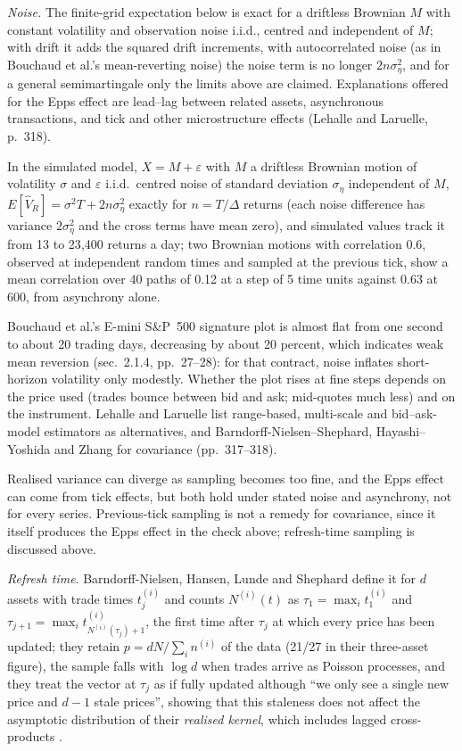 \begin{qfmethod}
\emph{Noise.} The finite-grid expectation below is exact for a driftless Brownian $M$ with constant volatility and observation noise i.i.d., centred and independent of $M$; with drift it adds the squared drift increments, with autocorrelated noise (as in Bouchaud et al.'s mean-reverting noise) the noise term is no longer $2n\sigma_\eta^2$, and for a general semimartingale only the limits above are claimed. Explanations offered for the Epps effect are lead--lag between related assets, asynchronous transactions, and tick and other microstructure effects (Lehalle and Laruelle, p.~318).

In the simulated model, $X=M+\varepsilon$ with $M$ a driftless Brownian motion of volatility $\sigma$ and $\varepsilon$ i.i.d.\ centred noise of standard deviation $\sigma_\eta$ independent of $M$, $E[\hat V_R]=\sigma^2T+2n\sigma_\eta^2$ exactly for $n=T/\Delta$ returns (each noise difference has variance $2\sigma_\eta^2$ and the cross terms have mean zero), and simulated values track it from 13 to 23{,}400 returns a day; two Brownian motions with correlation 0.6, observed at independent random times and sampled at the previous tick, show a mean correlation over 40 paths of 0.12 at a step of 5 time units against 0.63 at 600, from asynchrony alone.

 Bouchaud et al.'s E-mini S\&P~500 signature plot is almost flat from one second to about 20 trading days, decreasing by about 20 percent, which indicates weak mean reversion (sec.~2.1.4, pp.~27--28): for that contract, noise inflates short-horizon volatility only modestly. Whether the plot rises at fine steps depends on the price used (trades bounce between bid and ask; mid-quotes much less) and on the instrument. Lehalle and Laruelle list range-based, multi-scale and bid--ask-model estimators as alternatives, and Barndorff-Nielsen--Shephard, Hayashi--Yoshida and Zhang for covariance (pp.~317--318).

 Realised variance can diverge as sampling becomes too fine, and the Epps effect can come from tick effects, but both hold under stated noise and asynchrony, not for every series. Previous-tick sampling is not a remedy for covariance, since it itself produces the Epps effect in the check above; refresh-time sampling is discussed above.

\emph{Refresh time}. Barndorff-Nielsen, Hansen, Lunde and Shephard define it for $d$ assets with trade times $t^{(i)}_j$ and counts $N^{(i)}(t)$ as $\tau_1=\max_i t^{(i)}_1$ and $\tau_{j+1}=\max_i t^{(i)}_{N^{(i)}(\tau_j)+1}$, the first time after $\tau_j$ at which every price has been updated; they retain $p=dN/\sum_i n^{(i)}$ of the data (21/27 in their three-asset figure), the sample falls with $\log d$ when trades arrive as Poisson processes, and they treat the vector at $\tau_j$ as if fully updated although ``we only see a single new price and $d-1$ stale prices'', showing that this staleness does not affect the asymptotic distribution of their \emph{realised kernel}, which includes lagged cross-products \citep[sec.~2.1.1, Definition~1 with nn.~2--3 and Figure~1, pp.~4--5]{bnhls-2008}.


\end{qfmethod}
